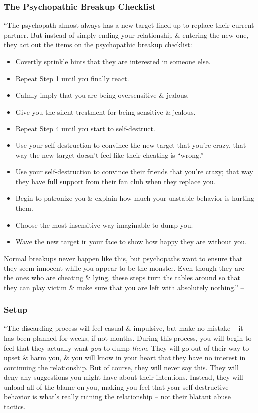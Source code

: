 \documentclass{article}
\numberwithin{equation}{section}
\begin{document}
\subsubsection{The Psychopathic Breakup Checklist}
``The psychopath almost always has a new target lined up to replace their current partner. But instead of simply ending your relationship \& entering the new one, they act out the items on the psychopathic breakup checklist:
\begin{itemize}
	\item Covertly sprinkle hints that they are interested in someone else.
	\item Repeat Step 1 until you finally react.
	\item Calmly imply that you are being oversensitive \& jealous.
	\item Give you the silent treatment for being sensitive \& jealous.
	\item Repeat Step 4 until you start to self-destruct.
	\item Use your self-destruction to convince the new target that you're crazy, that way the new target doesn't feel like their cheating is ``wrong.''
	\item Use your self-destruction to convince their friends that you're crazy; that way they have full support from their fan club when they replace you.
	\item Begin to patronize you \& explain how much your unstable behavior is hurting them.
	\item Choose the most insensitive way imaginable to dump you.
	\item Wave the new target in your face to show how happy they are without you.
\end{itemize}
Normal breakups never happen like this, but psychopaths want to ensure that they seem innocent while you appear to be the monster. Even though they are the ones who are cheating \& lying, these steps turn the tables around so that they can play victim \& make sure that you are left with absolutely nothing.'' -- \cite[pp. 71--72]{MacKenzie2015}

\subsubsection{Setup}
``The discarding process will feel casual \& impulsive, but make no mistake -- it has been planned for weeks, if not months. During this process, you will begin to feel that they actually want \textit{you} to dump \textit{them}. They will go out of their way to upset \& harm you, \& you will know in your heart that they have no interest in continuing the relationship. But of course, they will never say this. They will deny any suggestions you might have about their intentions. Instead, they will unload all of the blame on you, making you feel that your self-destructive behavior is what's really ruining the relationship -- not their blatant abuse tactics.
\end{document}
